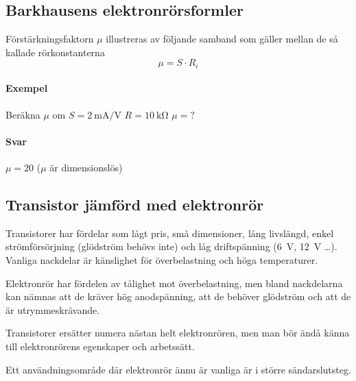 \subsection{Barkhausens elektronrörsformler}

Förstärkningsfaktorn \(\mu \) illustreras av följande samband som gäller mellan
de så kallade rörkonstanterna
\[\mu = S \cdot R_i\]
\paragraph{Exempel}
Beräkna \(\mu\)  om \(S = \SI{2}{\milli\ampere\per\volt}\) \(R = \SI{10}{\kilo\ohm}\) \(\mu = ?\)

\paragraph{Svar} \(\mu = 20\) (\(\mu\)  är dimensionslös)

\subsection{Transistor jämförd med elektronrör}

Transistorer har fördelar som lågt pris, små dimensioner, lång livslängd, enkel
strömförsörjning (glödström behövs inte) och låg driftspänning (\SI{6}{\volt},
\SI{12}{\volt} \ldots ).
Vanliga nackdelar är känslighet för överbelastning och höga temperaturer.

Elektronrör har fördelen av tålighet mot överbelastning, men bland nackdelarna
kan nämnas att de kräver hög anodspänning, att de behöver glödström och att de
är utrymmeskrävande.

Transistorer ersätter numera nästan helt elektronrören, men man bör ändå känna
till elektronrörens egenskaper och arbetssätt.

Ett användningsområde där elektronrör ännu är vanliga är i större
sändarslutsteg.
